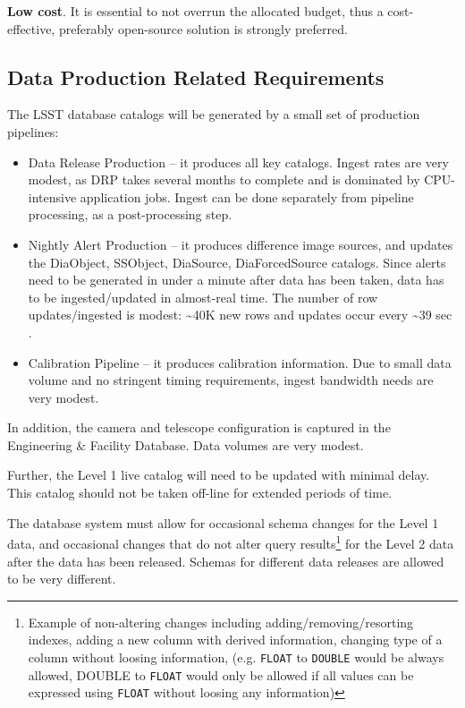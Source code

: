 \documentclass[DM,lsstdraft,toc]{lsstdoc}
\begin{document}
\textbf{Low cost}. It is essential to not overrun the allocated budget,
thus a cost-effective, preferably open-source solution is strongly
preferred.

\subsection{Data Production Related Requirements}\label{data-production-related-requirements}

The LSST database catalogs will be generated by a small set of production
pipelines:

\begin{itemize}
\item
  Data Release Production -- it produces all key catalogs. Ingest rates
  are very modest, as DRP takes several months to complete and is
  dominated by CPU-intensive application jobs. Ingest can be done
  separately from pipeline processing, as a post-processing step.
\item
  Nightly Alert Production -- it produces difference image sources, and
  updates the DiaObject, SSObject, DiaSource, DiaForcedSource catalogs.
  Since alerts need to be generated in under a minute after data has
  been taken, data has to be ingested/updated in almost-real time. The
  number of row updates/ingested is modest: \textasciitilde{}40K new
  rows and updates occur every \textasciitilde{}39 sec \citep{2008ASPC..394..114B}.
\item
  Calibration Pipeline -- it produces calibration information. Due to
  small data volume and no stringent timing requirements, ingest
  bandwidth needs are very modest.
\end{itemize}

In addition, the camera and telescope configuration is captured in the
Engineering \& Facility Database. Data volumes are very modest.

Further, the Level 1 live catalog will need to be updated with minimal
delay. This catalog should not be taken off-line for extended periods of
time.

The database system must allow for occasional schema changes for the
Level 1 data, and occasional changes that do not alter query
results\footnote{Example of non-altering changes including
  adding/removing/resorting indexes, adding a new column with derived
  information, changing type of a column without loosing information,
  (e.g. \texttt{FLOAT} to \texttt{DOUBLE} would be always allowed,
  DOUBLE to \texttt{FLOAT} would only be allowed if all values can be
  expressed using \texttt{FLOAT} without loosing any information)} for
the Level 2 data after the data has been released. Schemas for different
data releases are allowed to be very different.
\end{document}
